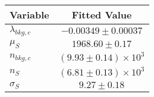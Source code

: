 \begin{tabular}[t]{lc}
\hline
Variable &Fitted Value\\
\hline\hline
$\lambda_{bkg,c}$&$-0.00349\pm0.00037$\\
\hline
$\mu_{S}$&$1968.60\pm0.17$\\
\hline
$n_{bkg,c}$&$(9.93\pm0.14)\times 10^3$\\
\hline
$n_{S}$&$(6.81\pm0.13)\times 10^3$\\
\hline
$\sigma_{S}$&$9.27\pm0.18$\\
\hline
\end{tabular}